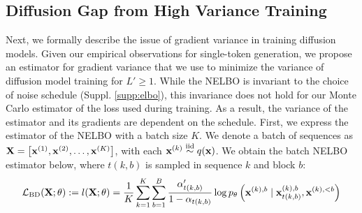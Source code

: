 \documentclass{article} %
\newcommand{\vkl}[1]{\textcolor{blue}{[VK: #1]}}
\begin{document}
\subsection{Diffusion Gap from High Variance Training}
Next, we formally describe the issue of gradient variance in training diffusion models. Given our empirical observations for single-token generation, we propose an estimator for gradient variance that we use to minimize the variance of diffusion model training for $L' \geq 1$. While the NELBO is invariant to the choice of noise schedule (Suppl. \ref{supp:elbo}), this invariance does not hold for our Monte Carlo estimator of the loss used during training. %
As a result, the variance of the estimator and its gradients are dependent on the schedule. First, we express the estimator of the NELBO %
with a batch size $K$.
We denote a batch of sequences as $\mathbf{X} = \left[{\mathbf x}^{(1)}, {\mathbf x}^{(2)}, \ldots, {\mathbf x}^{(K)}\right]$, with each ${\mathbf x}^{(k)}\overset{\text{iid}}\sim q({\mathbf x})$. We obtain the batch NELBO estimator below, where $t(k, b)$ is sampled in sequence $k$ and block $b$:
\begin{align}
\mathcal{L}_\text{BD}(\mathbf{X}; \theta)
:= l(\mathbf{X}; \theta)
= \frac{1}{K} \sum_{k=1}^K \sum_{b=1}^B  \frac{\alpha_{t(k, b)}'}{1-\alpha_{t(k,b)}}
\log p_\theta \left(
    {\mathbf x}^{(k),b} \mid {\mathbf x}_{t(k,b)}^{(k),b}, {\mathbf x}^{(k), <b}
\right)
\end{align}



\end{document}
